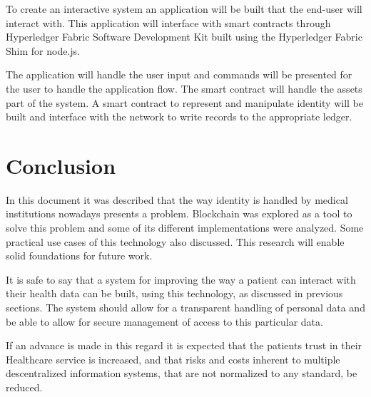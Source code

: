 \documentclass[]{llncs}
\begin{document}
To create an interactive system an application will be built that the end-user will interact with. 
This application will interface with smart contracts through Hyperledger Fabric Software Development Kit 
built using the Hyperledger Fabric Shim for node.js.

The application will handle the user input and commands will be presented for the user to handle the application flow. 
The smart contract will handle the assets part of the system. 
A smart contract to represent and manipulate identity will be built and interface with the network 
to write records to the appropriate ledger.
\newpage

\section{Conclusion} \label{conclusion}
In this document it was described that the way identity is handled by medical institutions nowadays 
presents a problem. Blockchain was explored as a tool to solve this problem and some of its different 
implementations were analyzed. Some practical use cases of this technology also discussed. 
This research will enable solid foundations for future work.

It is safe to say that a system for improving the way a patient can interact with their health data 
can be built, using this technology, as discussed in previous sections. 
The system should allow for a transparent handling of personal data and be able to allow for secure 
management of access to this particular data.

If an advance is made in this regard it is expected that the patients trust in their Healthcare service 
is increased, and that risks and costs inherent to multiple descentralized information systems, that are 
not normalized to any standard, be reduced. 
\newpage


\begingroup
\nocite{*}
\raggedright


\endgroup
\end{document}

